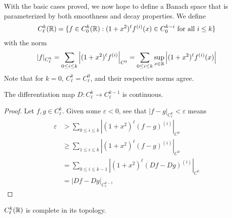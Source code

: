       With the basic cases proved, we now hope to define a Banach space that is parameterized by both smoothness and decay properties.
      We define
      \begin{align*}
        C^k_\ell(\mathbb{R}) = \{f\in C^k_0(\mathbb{R}):(1+x^2)^\ell f^{(i)}(x)\in C^{k-i}_0\text{ for all } i\le k\}
      \end{align*}
      with the norm
      \begin{align*}
        |f|_{C^k_\ell} = \sum_{0\le i\le k} \left|(1+x^2)^\ell f^{(i)}\right|_{C^0} = \sum_{0\le i\le k} \sup_{x\in\mathbb{R}} \left|(1+x^2)^\ell f^{(i)}(x)\right|
      \end{align*}
      Note that for $k=0$, $C^k_\ell=C^0_\ell$, and their respective norms agree.
      \begin{claim}
        \label{claim:diffcontCkl}
        The differentiation map $D:C^k_\ell\rightarrow C^{k-1}_\ell$ is continuous.
        \begin{proof}
          Let $f,g\in C^k_\ell$.
          Given some $\varepsilon<0$, see that $|f-g|_{C^k_\ell} < \varepsilon$ means
          \begin{align*}
            \varepsilon
            &> \sum_{0\le i\le k} \left|(1+x^2)^\ell(f-g)^{(i)}\right|_{C^0}
            \\&\ge \sum_{1\le i\le k} \left|(1+x^2)^\ell(f-g)^{(i)}\right|_{C^0}
            \\&= \sum_{0\le i\le k-1} \left|(1+x^2)^\ell(Df-Dg)^{(i)}\right|_{C^0}
            \\&= |Df-Dg|_{C^{k-1}_\ell}
          \end{align*}
        \end{proof}
      \end{claim}
      \begin{thm}
        \label{thm:cklcomplete}
        $C^k_\ell(\mathbb{R})$ is complete in its topology.
      \end{thm}
